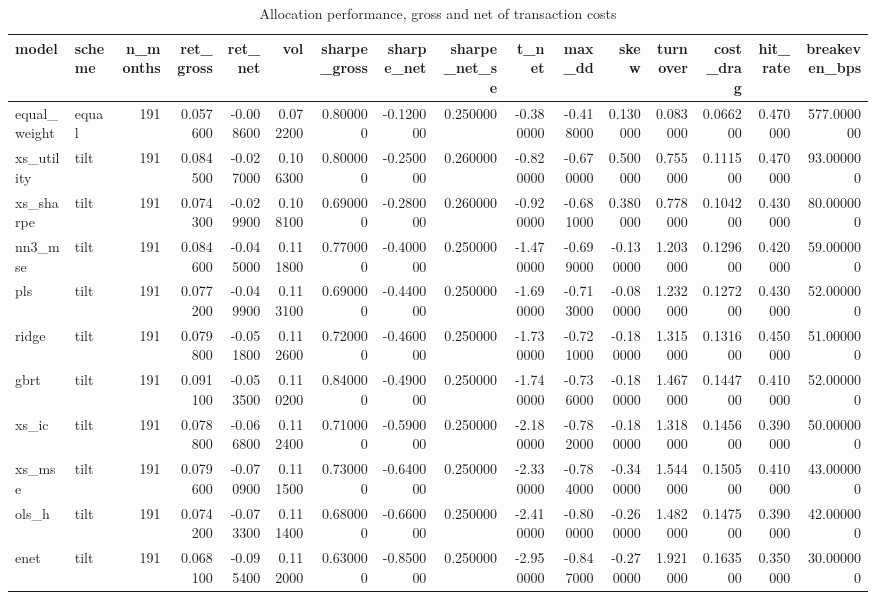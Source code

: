\begin{table}
\caption{Allocation performance, gross and net of transaction costs}
\label{tab:t2_economic}
\begin{tabular}{llrrrrrrrrrrrrrr}
\toprule
model & scheme & n\_months & ret\_gross & ret\_net & vol & sharpe\_gross & sharpe\_net & sharpe\_net\_se & t\_net & max\_dd & skew & turnover & cost\_drag & hit\_rate & breakeven\_bps \\
\midrule
equal\_weight & equal & 191 & 0.057600 & -0.008600 & 0.072200 & 0.800000 & -0.120000 & 0.250000 & -0.380000 & -0.418000 & 0.130000 & 0.083000 & 0.066200 & 0.470000 & 577.000000 \\
xs\_utility & tilt & 191 & 0.084500 & -0.027000 & 0.106300 & 0.800000 & -0.250000 & 0.260000 & -0.820000 & -0.670000 & 0.500000 & 0.755000 & 0.111500 & 0.470000 & 93.000000 \\
xs\_sharpe & tilt & 191 & 0.074300 & -0.029900 & 0.108100 & 0.690000 & -0.280000 & 0.260000 & -0.920000 & -0.681000 & 0.380000 & 0.778000 & 0.104200 & 0.430000 & 80.000000 \\
nn3\_mse & tilt & 191 & 0.084600 & -0.045000 & 0.111800 & 0.770000 & -0.400000 & 0.250000 & -1.470000 & -0.699000 & -0.130000 & 1.203000 & 0.129600 & 0.420000 & 59.000000 \\
pls & tilt & 191 & 0.077200 & -0.049900 & 0.113100 & 0.690000 & -0.440000 & 0.250000 & -1.690000 & -0.713000 & -0.080000 & 1.232000 & 0.127200 & 0.430000 & 52.000000 \\
ridge & tilt & 191 & 0.079800 & -0.051800 & 0.112600 & 0.720000 & -0.460000 & 0.250000 & -1.730000 & -0.721000 & -0.180000 & 1.315000 & 0.131600 & 0.450000 & 51.000000 \\
gbrt & tilt & 191 & 0.091100 & -0.053500 & 0.110200 & 0.840000 & -0.490000 & 0.250000 & -1.740000 & -0.736000 & -0.180000 & 1.467000 & 0.144700 & 0.410000 & 52.000000 \\
xs\_ic & tilt & 191 & 0.078800 & -0.066800 & 0.112400 & 0.710000 & -0.590000 & 0.250000 & -2.180000 & -0.782000 & -0.180000 & 1.318000 & 0.145600 & 0.390000 & 50.000000 \\
xs\_mse & tilt & 191 & 0.079600 & -0.070900 & 0.111500 & 0.730000 & -0.640000 & 0.250000 & -2.330000 & -0.784000 & -0.340000 & 1.544000 & 0.150500 & 0.410000 & 43.000000 \\
ols\_h & tilt & 191 & 0.074200 & -0.073300 & 0.111400 & 0.680000 & -0.660000 & 0.250000 & -2.410000 & -0.800000 & -0.260000 & 1.482000 & 0.147500 & 0.390000 & 42.000000 \\
enet & tilt & 191 & 0.068100 & -0.095400 & 0.112000 & 0.630000 & -0.850000 & 0.250000 & -2.950000 & -0.847000 & -0.270000 & 1.921000 & 0.163500 & 0.350000 & 30.000000 \\
\bottomrule
\end{tabular}
\end{table}
